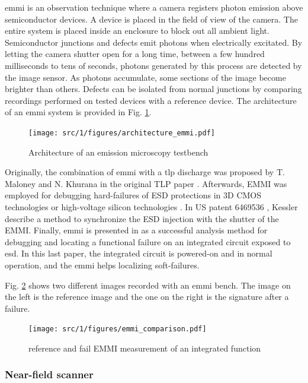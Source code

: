 \gls{emmi} is an observation technique where a camera registers photon emission above semiconductor devices.
A device is placed in the field of view of the camera.
The entire system is placed inside an enclosure to block out all ambient light.
Semiconductor junctions and defects emit photons when electrically excitated.
By letting the camera shutter open for a long time, between a few hundred milliseconds to tens of seconds, photons generated by this process are detected by the image sensor.
As photons accumulate, some sections of the image become brighter than others.
Defects can be isolated from normal junctions by comparing recordings performed on tested devices with a reference device.
The architecture of an \gls{emmi} system is provided in Fig. \ref{fig:emmi}.

\begin{figure}[!h]
  \centering
  \texttt{[image: src/1/figures/architecture\_emmi.pdf]}
  \caption{Architecture of an emission microscopy testbench}
  \label{fig:emmi}
\end{figure}

Originally, the combination of \gls{emmi} with a \gls{tlp} discharge was proposed by T. Maloney and N. Khurana in the original TLP paper \cite{TLP}.
Afterwards, EMMI was employed for debugging hard-failures of ESD protections in 3D CMOS technologies \cite{kessler2002method} or high-voltage silicon technologies \cite{emmi-tlp}.
In US patent 6469536 \cite{kessler2002method}, Kessler describe a method to synchronize the ESD injection with the shutter of the EMMI.
Finally, \gls{emmi} is presented in \cite{softfailEMMI} as a successful analysis method for debugging and locating a functional failure on an integrated circuit exposed to \gls{esd}.
In this last paper, the integrated circuit is powered-on and in normal operation, and the \gls{emmi} helps localizing soft-failures.

Fig. \ref{fig:emmi-examples} shows two different images recorded with an \gls{emmi} bench.
The image on the left is the reference image and the one on the right is the signature after a failure.

\begin{figure}[!h]
  \centering
  \texttt{[image: src/1/figures/emmi\_comparison.pdf]}
  \caption{reference and fail EMMI measurement of an integrated function}
  \label{fig:emmi-examples}
\end{figure}

\subsubsection{Near-field scanner}

